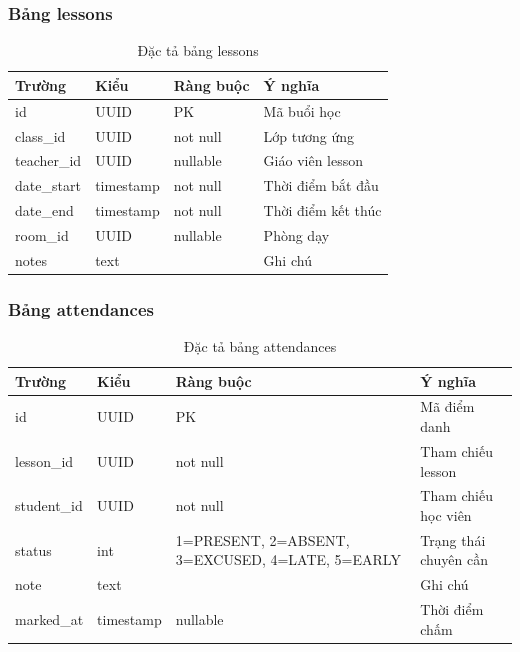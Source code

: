 \documentclass[../DoAn.tex]{subfiles}
\begin{document}
\subsubsection{Bảng lessons}
\begin{table}[H]
\centering
\caption{Đặc tả bảng lessons}
\scriptsize
\begin{tabular}{|l|l|l|p{4cm}|}
\hline
\textbf{Trường} & \textbf{Kiểu} & \textbf{Ràng buộc} & \textbf{Ý nghĩa} \\ \hline
id & UUID & PK & Mã buổi học \\ \hline
class\_id & UUID & not null & Lớp tương ứng \\ \hline
teacher\_id & UUID & nullable & Giáo viên lesson \\ \hline
date\_start & timestamp & not null & Thời điểm bắt đầu \\ \hline
date\_end & timestamp & not null & Thời điểm kết thúc \\ \hline
room\_id & UUID & nullable & Phòng dạy \\ \hline
notes & text & & Ghi chú \\ \hline
\end{tabular}
\end{table}

\subsubsection{Bảng attendances}
\begin{table}[H]
\centering
\caption{Đặc tả bảng attendances}
\scriptsize
\begin{tabular}{|l|l|p{3cm}|p{3.5cm}|}
\hline
\textbf{Trường} & \textbf{Kiểu} & \textbf{Ràng buộc} & \textbf{Ý nghĩa} \\ \hline
id & UUID & PK & Mã điểm danh \\ \hline
lesson\_id & UUID & not null & Tham chiếu lesson \\ \hline
student\_id & UUID & not null & Tham chiếu học viên \\ \hline
status & int & 1=PRESENT, 2=ABSENT, 3=EXCUSED, 4=LATE, 5=EARLY & Trạng thái chuyên cần \\ \hline
note & text & & Ghi chú \\ \hline
marked\_at & timestamp & nullable & Thời điểm chấm \\ \hline
\end{tabular}
\end{table}
\end{document}
